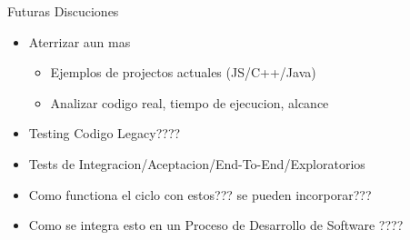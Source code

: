 
\begin{frame}{Futuras Discuciones}
    \begin{itemize}
        \item Aterrizar aun mas
        \begin{itemize}
            \item Ejemplos de projectos actuales (JS/C++/Java)
            \item Analizar codigo real, tiempo de ejecucion, alcance
        \end{itemize}
        \item Testing Codigo Legacy????
        \item Tests de Integracion/Aceptacion/End-To-End/Exploratorios
        \item Como functiona el ciclo con estos??? se pueden incorporar???
        \item Como se integra esto en un Proceso de Desarrollo de Software ????
    \end{itemize}
\end{frame}
